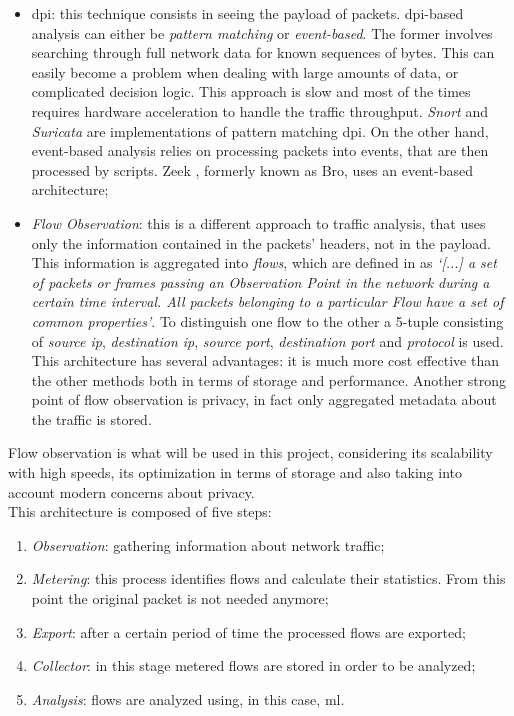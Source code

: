 \begin{itemize}
    \item[\faCaretRight] \gls{dpi}: this technique consists in seeing the payload of  packets. \gls{dpi}-based analysis can either be \textit{pattern matching} or \textit{event-based}. The former involves searching through full network data for known sequences of bytes. This can easily become a problem when dealing with large amounts of data, or complicated decision logic. This approach is slow and most of the times requires  hardware acceleration to handle the traffic throughput. \textit{Snort} \cite{SnortWebsite} and \textit{Suricata} \cite{SuricataWebsite} are implementations of pattern matching \gls{dpi}. On the other hand, event-based analysis relies on processing packets into events, that are then processed by scripts. Zeek \cite{ZeekWebsite}, formerly known as Bro, uses an event-based architecture;
    \item[\faCaretRight] \textit{Flow Observation}: this is a different approach to traffic analysis, that uses only the information contained in the packets' headers, not in the payload. This information is aggregated into \textit{flows}, which are defined in \cite{RFC7011} as \textit{`[...] a set of packets or frames passing an Observation Point in the network during a certain time interval. All packets belonging to a particular Flow have a set of common properties'}. To distinguish one flow to the other a 5-tuple consisting of \textit{source ip}, \textit{destination ip}, \textit{source port}, \textit{destination port} and \textit{protocol} is used. This architecture has several advantages: it is much more cost effective than the other methods both in terms of storage and performance. Another strong point of flow observation is privacy, in fact only aggregated metadata about the traffic is stored.
\end{itemize}

\noindent Flow observation is what will be used in this project, considering its scalability with high speeds, its optimization in terms of storage and also taking into account modern concerns about privacy. \\ This architecture is composed of five steps:

\begin{enumerate}
    \item \textit{Observation}: gathering information about network traffic;
    \item \textit{Metering}: this process identifies flows and calculate their statistics. From this point the original packet is not needed anymore;
    \item \textit{Export}: after a certain period of time the processed flows are exported;
    \item \textit{Collector}: in this stage metered flows are stored in order to be analyzed;
    \item \textit{Analysis}: flows are analyzed using, in this case, \gls{ml}.
\end{enumerate}

